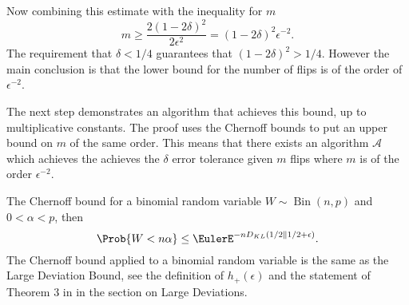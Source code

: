 \documentclass[12pt]{article}
\begin{document}
Now combining this estimate with the inequality for $m$
\[
  m \ge \frac{2 (1 - 2\delta)^2}{2 \epsilon^2} =
  (1 - 2\delta)^2 \epsilon^{-2}.
\]
The requirement that $\delta < 1/4$ guarantees that $(1 - 2\delta)^2 >
1/4$.  However the main conclusion is that the lower bound for the
number of flips is of the order of $\epsilon^{-2}$.

The next step demonstrates an algorithm that achieves this bound, up
to multiplicative constants.
The proof uses the Chernoff bounds to put an upper bound on $m$ of the same
order.  This means that there exists an algorithm $\mathcal{A}$ which
achieves the achieves the $\delta$ error tolerance given $m$ flips
where $m$ is of the order $\epsilon^{-2}$.

The Chernoff bound for a binomial random variable $W \sim
\operatorname{Bin}(n,p)$ and $0 < \alpha < p$, then
\[
  \Prob{W < n\alpha} \le \EulerE^{-n D_{KL}(1/2 \parallel 1/2+\epsilon) }.
\]
The Chernoff bound applied to a binomial random variable is the same
as the Large Deviation Bound, see the definition of $h_+(\epsilon)$ and
the statement of Theorem 3 in
 in the section on Large Deviations.
\end{document}
